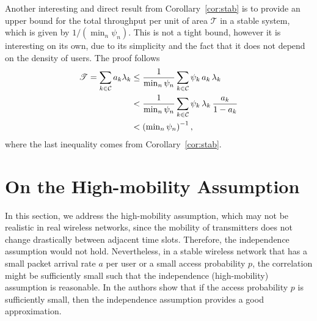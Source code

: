 Another interesting and direct result from Corollary~\ref{cor:stab} is to provide an upper bound for the total throughput per unit of area $\mathscr{T}$ in a stable system, which is given by $1/(\min_n\psi_n)$.
%
This is not a tight bound, however it is interesting on its own, due to its simplicity and the fact that it does not depend on the density of users. The proof follows
\begin{align}
	\mathscr{T} = \sum_{k\in\cal{C}} a_k\lambda_k &\le \frac{1}{\min_{n}\psi_n} \sum_{k\in\cal{C}} \psi_k\,a_k\,\lambda_k \nonumber\\
        &< \frac{1}{\min_{n}\psi_n} \sum_{k\in\cal{C}}\psi_k\,\lambda_k\,\frac{a_k}{1-a_k} \nonumber\\
        &< \left(\textstyle\min_{n}\psi_n \right)^{-1},
\end{align}
where the last inequality comes from Corollary~\ref{cor:stab}.

\section{On the High-mobility Assumption} \label{sec:high-mobility}

In this section, we address the high-mobility assumption, which may not be realistic in real wireless networks, since the mobility of transmitters does not change drastically between adjacent time slots. Therefore, the independence assumption would not hold.
%
Nevertheless, in a stable wireless network that has a small packet arrival rate $a$ per user or a small access probability $p$, the correlation might be sufficiently small such that the independence (high-mobility) assumption is reasonable. In \cite{haenggi2013diversity} the authors show that if the access probability $p$ is sufficiently small, then the independence assumption provides a good approximation.


